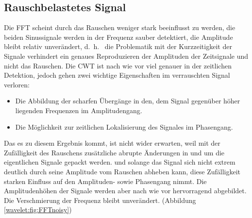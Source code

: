 \subsection{Rauschbelastetes Signal
	\label{wavelets:subsection:CWTvsFFTRauschbelastet}}
Die FFT scheint durch das Rauschen weniger stark beeinflusst zu werden, die beiden Sinussignale werden in der Frequenz sauber detektiert, die Amplitude bleibt relativ unverändert, d.~h.~ die Problematik mit der Kurzzeitigkeit der Signale verhindert ein genaues Reproduzieren der Amplituden der Zeitsignale und nicht das Rauschen.
Die CWT ist nach wie vor viel genauer in der zeitlichen Detektion, jedoch gehen zwei wichtige Eigenschaften im verrauschten Signal verloren:
\begin{itemize}
	\item Die Abbildung der scharfen Übergänge in den, dem Signal gegenüber höher liegenden Frequenzen im Amplitudengang.
	\item Die Möglichkeit zur zeitlichen Lokalisierung des Signales im Phasengang.
\end{itemize}
Das es zu diesem Ergebnis kommt, ist nicht wider erwarten, weil mit der Zufälligkeit des Rauschens zusätzliche abrupte Änderungen in und um die eigentlichen Signale gepackt werden. und solange das Signal sich nicht extrem deutlich durch seine Amplitude vom Rauschen abheben kann, diese Zufälligkeit starken Einfluss auf den Amplituden- sowie Phasengang nimmt.
Die Amplitudenhöhen der Signale werden aber nach wie vor hervorragend abgebildet. Die Verschmierung der Frequenz bleibt unverändert.
(Abbildung \ref{wavelet:fig:FFTnoisy})
	
